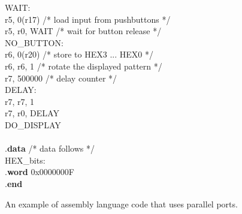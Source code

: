\begin{figure}[h!]
\begin{center}
\begin{minipage}[t]{12.5 cm}
\begin{tabbing}
WAIT:\\
 \>r5, 0(r17) \>/* load input from pushbuttons */\\
 \>r5, r0, WAIT \>/* wait for button release */\\
NO\_BUTTON:\\
 \>r6, 0(r20) \>/* store to HEX3 ... HEX0 */\\
 \>r6, r6, 1 \>/* rotate the displayed pattern */\\
 \>r7, 500000 \>/* delay counter */\\
DELAY:	\\
 \>r7, r7, 1\\
 \>r7, r0, DELAY	\\
 \>DO\_DISPLAY\\
~\\
\>.{\bf data}	\>\>/* data follows */\\
HEX\_bits:\\
\>.{\bf word} \>0x0000000F\\
\>.{\bf end}\\
\end{tabbing}
\end{minipage}
\end{center}
	\vspace{-0.33in}\caption{An example of assembly language code that uses parallel ports.}
   \label{fig:getting_started_s}
\end{figure}